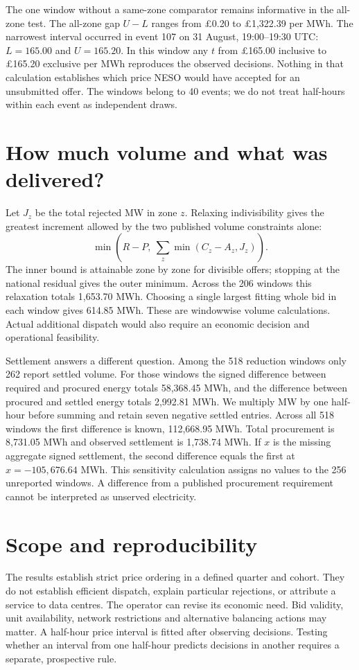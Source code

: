 \documentclass[11pt]{article}
\begin{document}
The one window without a same-zone comparator remains informative in the all-zone test. The all-zone gap $U-L$ ranges from \pounds0.20 to \pounds1,322.39 per MWh. The narrowest interval occurred in event 107 on 31 August, 19:00--19:30 UTC: $L=165.00$ and $U=165.20$. In this window any $t$ from \pounds165.00 inclusive to \pounds165.20 exclusive per MWh reproduces the observed decisions. Nothing in that calculation establishes which price NESO would have accepted for an unsubmitted offer. The windows belong to 40 events; we do not treat half-hours within each event as independent draws.

\section{How much volume and what was delivered?}
Let $J_z$ be the total rejected MW in zone $z$. Relaxing indivisibility gives the greatest increment allowed by the two published volume constraints alone:
\[
\min\left(R-P,\ \sum_z\min(C_z-A_z,J_z)\right).
\]
The inner bound is attainable zone by zone for divisible offers; stopping at the national residual gives the outer minimum. Across the 206 windows this relaxation totals 1,653.70 MWh. Choosing a single largest fitting whole bid in each window gives 614.85 MWh. These are windowwise volume calculations. Actual additional dispatch would also require an economic decision and operational feasibility.

Settlement answers a different question. Among the 518 reduction windows only 262 report settled volume. For those windows the signed difference between required and procured energy totals 58,368.45 MWh, and the difference between procured and settled energy totals 2,992.81 MWh. We multiply MW by one half-hour before summing and retain seven negative settled entries. Across all 518 windows the first difference is known, 112,668.95 MWh. Total procurement is 8,731.05 MWh and observed settlement is 1,738.74 MWh. If $x$ is the missing aggregate signed settlement, the second difference equals the first at $x=-105{,}676.64$ MWh. This sensitivity calculation assigns no values to the 256 unreported windows. A difference from a published procurement requirement cannot be interpreted as unserved electricity.

\section{Scope and reproducibility}
The results establish strict price ordering in a defined quarter and cohort. They do not establish efficient dispatch, explain particular rejections, or attribute a service to data centres. The operator can revise its economic need. Bid validity, unit availability, network restrictions and alternative balancing actions may matter. A half-hour price interval is fitted after observing decisions. Testing whether an interval from one half-hour predicts decisions in another requires a separate, prospective rule.
\end{document}
